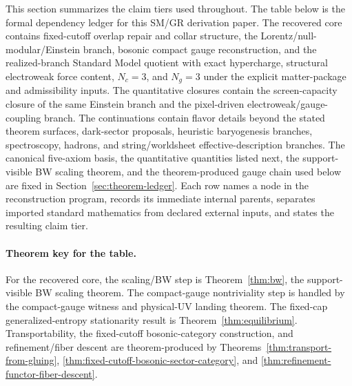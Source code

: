 \documentclass[11pt]{article}
\begin{document}
This section summarizes the claim tiers used throughout. The table below is the formal dependency
ledger for this SM/GR derivation paper. The recovered core contains fixed-cutoff overlap repair and
collar structure, the Lorentz/null-modular/Einstein branch, bosonic compact gauge reconstruction,
and the realized-branch Standard Model quotient with exact hypercharge, structural electroweak force content, \(N_c=3\), and \(N_g=3\)
under the explicit matter-package and admissibility inputs. The quantitative closures contain the
screen-capacity closure of the same Einstein branch and the pixel-driven electroweak/gauge-coupling
branch. The continuations contain flavor details beyond the stated theorem surfaces, dark-sector
proposals, heuristic baryogenesis branches, spectroscopy, hadrons, and string/worldsheet
effective-description branches. The canonical five-axiom basis, the quantitative quantities listed
next, the support-visible BW scaling theorem, and the theorem-produced gauge chain used below are
fixed in Section~\ref{sec:theorem-ledger}. Each row names a node in the reconstruction program,
records its immediate internal parents, separates imported standard mathematics from declared
external inputs, and states the resulting claim tier.

\paragraph{Theorem key for the table.}
For the recovered core, the scaling/BW step is Theorem~\ref{thm:bw}, the support-visible BW scaling theorem. The compact-gauge nontriviality step is handled by the compact-gauge witness and physical-UV landing theorem. The fixed-cap generalized-entropy stationarity result is Theorem~\ref{thm:equilibrium}. Transportability, the fixed-cutoff bosonic-category construction, and refinement/fiber descent are theorem-produced by Theorems~\ref{thm:transport-from-gluing}, \ref{thm:fixed-cutoff-bosonic-sector-category}, and \ref{thm:refinement-functor-fiber-descent}.
\end{document}
